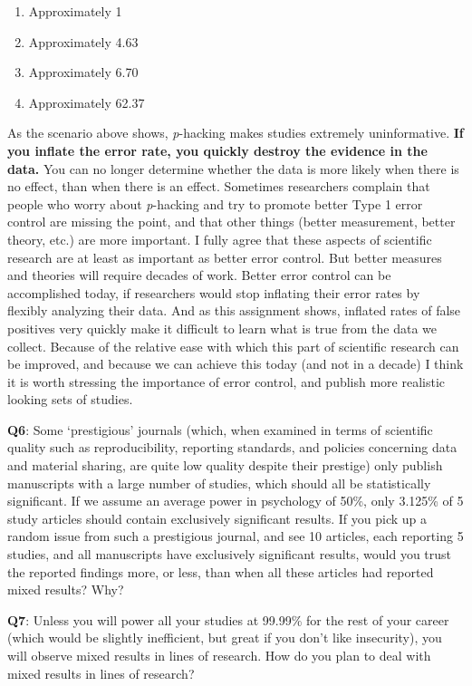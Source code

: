 \documentclass[
]{krantz}
\providecommand{\tightlist}{%
  \setlength{\itemsep}{0pt}\setlength{\parskip}{0pt}}
\begin{document}
\begin{enumerate}
\def\labelenumi{\Alph{enumi})}
\tightlist
\item
  Approximately 1
\item
  Approximately 4.63
\item
  Approximately 6.70
\item
  Approximately 62.37
\end{enumerate}

As the scenario above shows, \emph{p}-hacking makes studies extremely uninformative.
\textbf{If you inflate the error rate, you quickly destroy the evidence in the data.} You can no longer determine whether the data is more likely when there is no effect, than when there is an effect. Sometimes researchers complain that people who worry about \emph{p}-hacking and try to promote better Type 1 error control are missing the point, and that other things (better measurement, better theory, etc.) are more important. I fully agree that these aspects of scientific research are at least as important as better error control. But better measures and theories will require decades of work. Better error control can be accomplished today, if researchers would stop inflating their error rates by flexibly analyzing their data. And as this assignment shows, inflated rates of false positives very quickly make it difficult to learn what is true from the data we collect. Because of the relative ease with which this part of scientific research can be improved, and because we can achieve this today (and not in a decade) I think it is worth stressing the importance of error control, and publish more realistic looking sets of studies.

\textbf{Q6}: Some `prestigious' journals (which, when examined in terms of scientific quality such as reproducibility, reporting standards, and policies concerning data and material sharing, are quite low quality despite their prestige) only publish manuscripts with a large number of studies, which should all be statistically significant. If we assume an average power in psychology of 50\%, only 3.125\% of 5 study articles should contain exclusively significant results. If you pick up a random issue from such a prestigious journal, and see 10 articles, each reporting 5 studies, and all manuscripts have exclusively significant results, would you trust the reported findings more, or less, than when all these articles had reported mixed results? Why?

\textbf{Q7}: Unless you will power all your studies at 99.99\% for the rest of your career (which would be slightly inefficient, but great if you don't like insecurity), you will observe mixed results in lines of research. How do you plan to deal with mixed results in lines of research?
\end{document}
